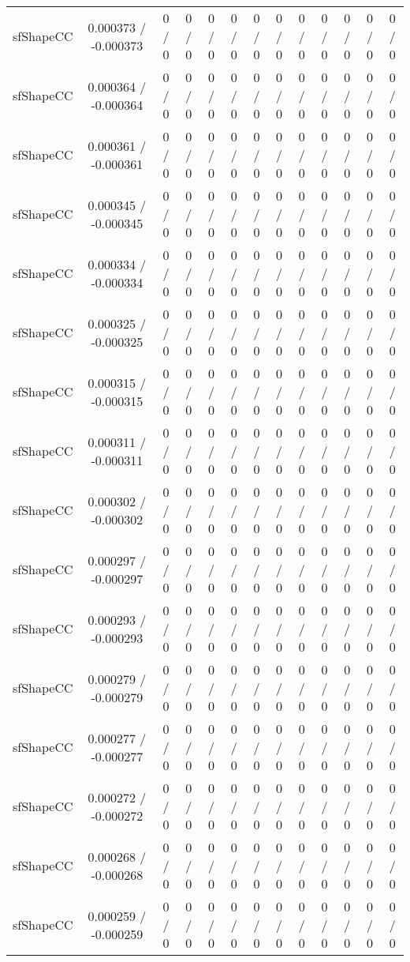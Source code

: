 \documentclass[10pt]{article}
\begin{document}
\begin{table}[htbp]
\begin{center}
\begin{tabular}{|c|c|c|c|c|c|c|c|c|c|c|c|c|}
  sfShapeCC & 0.000373 / -0.000373 & 0 / 0 & 0 / 0 & 0 / 0 & 0 / 0 & 0 / 0 & 0 / 0 & 0 / 0 & 0 / 0 & 0 / 0 & 0 / 0 & 0 / 0 \\ 
  sfShapeCC & 0.000364 / -0.000364 & 0 / 0 & 0 / 0 & 0 / 0 & 0 / 0 & 0 / 0 & 0 / 0 & 0 / 0 & 0 / 0 & 0 / 0 & 0 / 0 & 0 / 0 \\ 
  sfShapeCC & 0.000361 / -0.000361 & 0 / 0 & 0 / 0 & 0 / 0 & 0 / 0 & 0 / 0 & 0 / 0 & 0 / 0 & 0 / 0 & 0 / 0 & 0 / 0 & 0 / 0 \\ 
  sfShapeCC & 0.000345 / -0.000345 & 0 / 0 & 0 / 0 & 0 / 0 & 0 / 0 & 0 / 0 & 0 / 0 & 0 / 0 & 0 / 0 & 0 / 0 & 0 / 0 & 0 / 0 \\ 
  sfShapeCC & 0.000334 / -0.000334 & 0 / 0 & 0 / 0 & 0 / 0 & 0 / 0 & 0 / 0 & 0 / 0 & 0 / 0 & 0 / 0 & 0 / 0 & 0 / 0 & 0 / 0 \\ 
  sfShapeCC & 0.000325 / -0.000325 & 0 / 0 & 0 / 0 & 0 / 0 & 0 / 0 & 0 / 0 & 0 / 0 & 0 / 0 & 0 / 0 & 0 / 0 & 0 / 0 & 0 / 0 \\ 
  sfShapeCC & 0.000315 / -0.000315 & 0 / 0 & 0 / 0 & 0 / 0 & 0 / 0 & 0 / 0 & 0 / 0 & 0 / 0 & 0 / 0 & 0 / 0 & 0 / 0 & 0 / 0 \\ 
  sfShapeCC & 0.000311 / -0.000311 & 0 / 0 & 0 / 0 & 0 / 0 & 0 / 0 & 0 / 0 & 0 / 0 & 0 / 0 & 0 / 0 & 0 / 0 & 0 / 0 & 0 / 0 \\ 
  sfShapeCC & 0.000302 / -0.000302 & 0 / 0 & 0 / 0 & 0 / 0 & 0 / 0 & 0 / 0 & 0 / 0 & 0 / 0 & 0 / 0 & 0 / 0 & 0 / 0 & 0 / 0 \\ 
  sfShapeCC & 0.000297 / -0.000297 & 0 / 0 & 0 / 0 & 0 / 0 & 0 / 0 & 0 / 0 & 0 / 0 & 0 / 0 & 0 / 0 & 0 / 0 & 0 / 0 & 0 / 0 \\ 
  sfShapeCC & 0.000293 / -0.000293 & 0 / 0 & 0 / 0 & 0 / 0 & 0 / 0 & 0 / 0 & 0 / 0 & 0 / 0 & 0 / 0 & 0 / 0 & 0 / 0 & 0 / 0 \\ 
  sfShapeCC & 0.000279 / -0.000279 & 0 / 0 & 0 / 0 & 0 / 0 & 0 / 0 & 0 / 0 & 0 / 0 & 0 / 0 & 0 / 0 & 0 / 0 & 0 / 0 & 0 / 0 \\ 
  sfShapeCC & 0.000277 / -0.000277 & 0 / 0 & 0 / 0 & 0 / 0 & 0 / 0 & 0 / 0 & 0 / 0 & 0 / 0 & 0 / 0 & 0 / 0 & 0 / 0 & 0 / 0 \\ 
  sfShapeCC & 0.000272 / -0.000272 & 0 / 0 & 0 / 0 & 0 / 0 & 0 / 0 & 0 / 0 & 0 / 0 & 0 / 0 & 0 / 0 & 0 / 0 & 0 / 0 & 0 / 0 \\ 
  sfShapeCC & 0.000268 / -0.000268 & 0 / 0 & 0 / 0 & 0 / 0 & 0 / 0 & 0 / 0 & 0 / 0 & 0 / 0 & 0 / 0 & 0 / 0 & 0 / 0 & 0 / 0 \\ 
  sfShapeCC & 0.000259 / -0.000259 & 0 / 0 & 0 / 0 & 0 / 0 & 0 / 0 & 0 / 0 & 0 / 0 & 0 / 0 & 0 / 0 & 0 / 0 & 0 / 0 & 0 / 0 \\ 

\end{tabular}
\end{center}
\end{table}
\end{document}
